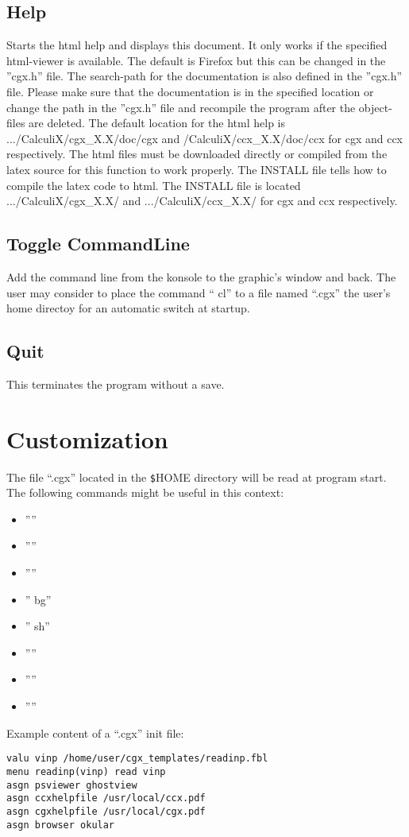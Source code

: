 \documentclass{article}
\begin{document}
\subsection{\label{Help}Help}
Starts the html help and displays this document. It only works if the specified html-viewer is available. The default is Firefox \cite{Firefox} but this can be changed in the ''cgx.h'' file. The search-path for the documentation is also defined in the ''cgx.h'' file. Please make sure that the documentation is in the specified location or change the path in the ''cgx.h'' file and recompile the program after the object-files are deleted.  The default location for the html help is .../CalculiX/cgx\_X.X/doc/cgx and /CalculiX/ccx\_X.X/doc/ccx for cgx and ccx respectively.  The html files must be downloaded directly or compiled from the latex source for this function to work properly. The INSTALL file tells how to compile the latex code to html.  The INSTALL file is located .../CalculiX/cgx\_X.X/ and .../CalculiX/ccx\_X.X/ for cgx and ccx respectively.

\subsection{\label{Toggle CommandLine}Toggle CommandLine}
Add the command line from the konsole to the graphic's window and back. The user may consider to place the command `` cl'' to a file named ``.cgx'' the user's home directoy for an automatic switch at startup.

\subsection{\label{Quit}Quit}
This terminates the program without a save.

\section{\label{Customization}Customization}
The file ``.cgx'' located in the \verb_$_HOME directory will be read at program start. The following commands might be useful in this context: 
\begin{itemize}
\item ''''
\item ''''
\item ''''
\item '' bg''
\item '' sh''
\item ''''
\item ''''
\item ''''
\end{itemize}
Example content of a ``.cgx'' init file:
\begin{verbatim}
valu vinp /home/user/cgx_templates/readinp.fbl
menu readinp(vinp) read vinp
asgn psviewer ghostview
asgn ccxhelpfile /usr/local/ccx.pdf
asgn cgxhelpfile /usr/local/cgx.pdf
asgn browser okular
\end{verbatim}
\end{document}
